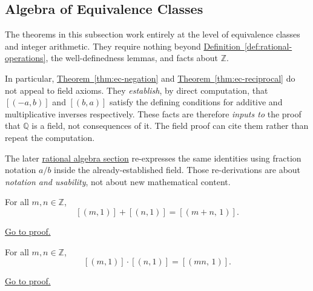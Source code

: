 \subsection*{Algebra of Equivalence Classes}

\begin{remark*}
\label{rem:ec-arithmetic-role}

The theorems in this subsection work entirely at the level of
equivalence classes and integer arithmetic.  They require nothing
beyond \hyperref[def:rational-operations]{Definition~\ref*{def:rational-operations}},
the well-definedness lemmas, and facts about $\mathbb{Z}$.

In particular, \hyperref[thm:ec-negation]{Theorem~\ref*{thm:ec-negation}}
and \hyperref[thm:ec-reciprocal]{Theorem~\ref*{thm:ec-reciprocal}} do
not appeal to field axioms.  They \emph{establish}, by direct
computation, that $[(-a,b)]$ and $[(b,a)]$ satisfy the defining
conditions for additive and multiplicative inverses respectively.
These facts are therefore \emph{inputs to} the proof that $\mathbb{Q}$
is a field, not consequences of it.  The field proof can cite them
rather than repeat the computation.

The later \hyperref[sec:rational-algebra]{rational algebra section}
re-expresses the same identities using fraction notation $a/b$ inside
the already-established field.  Those re-derivations are about
\emph{notation and usability}, not about new mathematical content.

\end{remark*}

\begin{theorem}
\label{thm:ec-integer-embedding-add}
For all $m,n\in\mathbb{Z}$,
\[
[(m,1)] + [(n,1)] = [(m+n,\,1)].
\]
\end{theorem}

\begin{remark*}[Proof]
\hyperref[prf:ec-integer-embedding-add]{Go to proof.}
\end{remark*}

\begin{theorem}
\label{thm:ec-integer-embedding-mul}
For all $m,n\in\mathbb{Z}$,
\[
[(m,1)] \cdot [(n,1)] = [(mn,\,1)].
\]
\end{theorem}

\begin{remark*}[Proof]
\hyperref[prf:ec-integer-embedding-mul]{Go to proof.}
\end{remark*}

